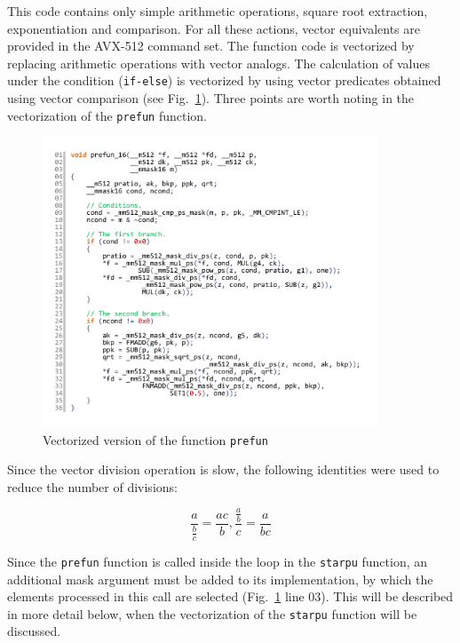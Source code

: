 \documentclass[utf8,english]{psta}%
\begin{document}
This code contains only simple arithmetic operations, square root extraction, exponentiation and comparison.
For all these actions, vector equivalents are provided in the AVX-512 command set.
The function code is vectorized by replacing arithmetic operations with vector analogs.
The calculation of values under the condition (\texttt{if-else}) is vectorized by using vector predicates obtained using vector comparison (see Fig.~\ref{pic:prefun_16_code}).
Three points are worth noting in the vectorization of the \texttt{prefun} function.

\begin{figure}
\includegraphics[width=10cm]{pics/pic_prefun_16_code}
\caption{Vectorized version of the function \texttt{prefun}}
\label{pic:prefun_16_code}
\end{figure}

Since the vector division operation is slow, the following identities were used to reduce the number of divisions:

\begin{equation}\label{eq:deldel}
\frac{a}{\frac{b}{c}} = \frac{ac}{b}, \frac{\frac{a}{b}}{c} = \frac{a}{bc}
\end{equation} 

Since the \texttt{prefun} function is called inside the loop in the \texttt{starpu} function, an additional mask argument must be added to its implementation, by which the elements processed in this call are selected (Fig.~\ref{pic:prefun_16_code} line 03).
This will be described in more detail below, when the vectorization of the \texttt{starpu} function will be discussed.
\end{document}

